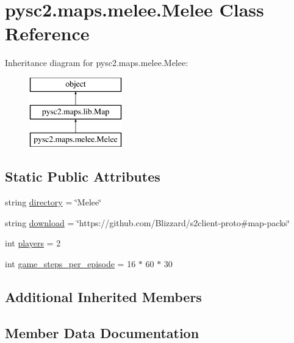 \hypertarget{classpysc2_1_1maps_1_1melee_1_1_melee}{}\section{pysc2.\+maps.\+melee.\+Melee Class Reference}
\label{classpysc2_1_1maps_1_1melee_1_1_melee}
Inheritance diagram for pysc2.\+maps.\+melee.\+Melee\+:\begin{figure}[H]
\begin{center}
\leavevmode
\includegraphics[height=3.000000cm]{classpysc2_1_1maps_1_1melee_1_1_melee}
\end{center}
\end{figure}
\subsection*{Static Public Attributes}
\begin{DoxyCompactItemize}
\item 
string \mbox{\hyperlink{classpysc2_1_1maps_1_1melee_1_1_melee_a74ef6f2f3e839293fe27b80608a5db52}{directory}} = \char`\"{}Melee\char`\"{}
\item 
string \mbox{\hyperlink{classpysc2_1_1maps_1_1melee_1_1_melee_ae2f0a3c320ab19f62ccb5291900acefb}{download}} = \char`\"{}https\+://github.\+com/Blizzard/s2client-\/proto\#map-\/packs\char`\"{}
\item 
int \mbox{\hyperlink{classpysc2_1_1maps_1_1melee_1_1_melee_a44c28f932ecb9b1c15935ac8678f2ea1}{players}} = 2
\item 
int \mbox{\hyperlink{classpysc2_1_1maps_1_1melee_1_1_melee_adc7b6fbbd52e49b0c93f620610ccdaab}{game\+\_\+steps\+\_\+per\+\_\+episode}} = 16 $\ast$ 60 $\ast$ 30
\end{DoxyCompactItemize}
\subsection*{Additional Inherited Members}


\subsection{Member Data Documentation}
\mbox{\label{classpysc2_1_1maps_1_1melee_1_1_melee_a74ef6f2f3e839293fe27b80608a5db52}} 
